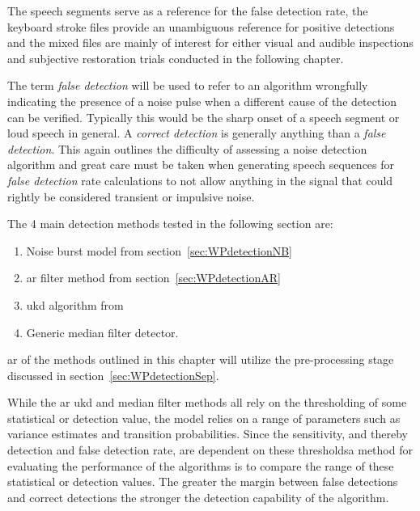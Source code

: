 The speech segments serve as a reference for the false detection rate, the keyboard stroke files provide an unambiguous reference for positive detections and the mixed files are mainly of interest for either visual and audible inspections and subjective restoration trials conducted in the following chapter. \DIFaddbegin {}\DIFaddend 

The term \emph{false detection} will be used to refer to an algorithm wrongfully indicating the presence of a noise pulse when a different cause of the detection can be verified. Typically this would be the sharp onset of a speech segment or \DIFdelbegin {}\DIFdelend loud speech in general. A \emph{correct detection} is generally anything \DIFdelbegin {}\DIFdelend \DIFaddbegin {}\DIFaddend than a \emph{false detection}. This again outlines the difficulty of assessing a noise detection algorithm and great care must be taken when generating speech sequences for \emph{false detection} rate calculations to not allow anything in the signal that could rightly be considered transient or impulsive noise.

The 4 main detection methods tested in the following section are:
\begin{enumerate}
  \item Noise burst model from section~\ref{sec:WPdetectionNB}
  \item \DIFdelbegin {}\DIFdelend \DIFaddbegin \gls{ar} \DIFaddend filter method from section~\ref{sec:WPdetectionAR}
  \item \DIFdelbegin {}\DIFdelend \DIFaddbegin \gls{ukd} \DIFaddend algorithm from \cite{Subramanya2007}
  \item Generic median filter detector.
\end{enumerate}
\DIFdelbegin {}\DIFdelend \DIFaddbegin {}\gls{ar} \DIFaddend of the methods outlined in this chapter will utilize the pre-processing stage discussed in section~\ref{sec:WPdetectionSep}.

While the \DIFdelbegin {}\DIFdelend \DIFaddbegin \gls{ar} \gls{ukd} \DIFaddend and median filter methods all rely on the thresholding of some statistical or detection value, the \DIFdelbegin {}\DIFdelend \DIFaddbegin {}\DIFaddend model relies on a range of parameters such as variance estimates and transition probabilities. Since the sensitivity, and thereby detection and false detection rate, are dependent on these thresholds\DIFaddbegin \DIFadd{, }\DIFaddend a method for evaluating the performance of the algorithms is to compare the range of these statistical or detection values. The greater the margin between false detections and correct detections the stronger the detection capability of the algorithm.

